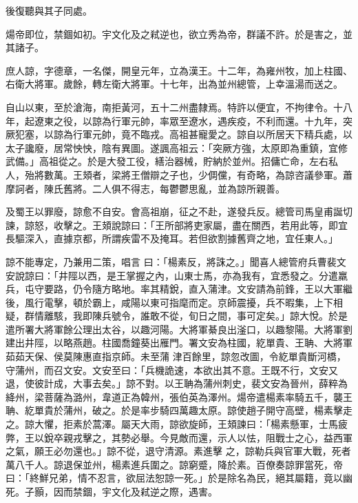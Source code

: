 \begin{pinyinscope}
 後復聽與其子同處。



 煬帝即位，禁錮如初。宇文化及之弒逆也，欲立秀為帝，群議不許。於是害之，並其諸子。



 庶人諒，字德章，一名傑，開皇元年，立為漢王。十二年，為雍州牧，加上柱國、右衛大將軍。歲餘，轉左衛大將軍。十七年，出為並州總管，上幸溫湯而送之。



 自山以東，至於滄海，南拒黃河，五十二州盡隸焉。特許以便宜，不拘律令。十八年，起遼東之役，以諒為行軍元帥，率眾至遼水，遇疾疫，不利而還。十九年，突厥犯塞，以諒為行軍元帥，竟不臨戎。高祖甚寵愛之。諒自以所居天下精兵處，以
 太子讒廢，居常怏怏，陰有異圖。遂諷高祖云：「突厥方強，太原即為重鎮，宜修武備。」高祖從之。於是大發工役，繕治器械，貯納於並州。招傭亡命，左右私人，殆將數萬。王頍者，梁將王僧辯之子也，少倜儻，有奇略，為諒咨議參軍。蕭摩訶者，陳氏舊將。二人俱不得志，每鬱鬱思亂，並為諒所親善。



 及蜀王以罪廢，諒愈不自安。會高祖崩，征之不赴，遂發兵反。總管司馬皇甫誕切諫，諒怒，收擊之。王頍說諒曰：「王所部將吏家屬，盡在關西，若用此等，即宜長驅深入，直據京都，所謂疾雷不及掩耳。若但欲割據舊齊之地，宜任東人。」



 諒不能專定，乃兼用二策，唱言
 曰：「楊素反，將誅之。」聞喜人總管府兵曹裴文安說諒曰：「井陘以西，是王掌握之內，山東士馬，亦為我有，宜悉發之。分遣羸兵，屯守要路，仍令隨方略地。率其精銳，直入蒲津。文安請為前鋒，王以大軍繼後，風行電擊，頓於霸上，咸陽以東可指麾而定。京師震擾，兵不暇集，上下相疑，群情離駭，我即陳兵號令，誰敢不從，旬日之間，事可定矣。」諒大悅。於是遣所署大將軍餘公理出太谷，以趣河陽。大將軍綦良出滏口，以趣黎陽。大將軍劉建出井陘，以略燕趙。柱國喬鐘葵出雁門。署文安為柱國，紇單貴、王聃、大將軍茹茹天保、侯莫陳惠直指京師。未至蒲
 津百餘里，諒忽改圖，令紇單貴斷河橋，守蒲州，而召文安。文安至曰：「兵機詭速，本欲出其不意。王既不行，文安又退，使彼計成，大事去矣。」諒不對。以王聃為蒲州刺史，裴文安為晉州，薛粹為絳州，梁菩薩為潞州，韋道正為韓州，張伯英為澤州。煬帝遣楊素率騎五千，襲王聃、紇單貴於蒲州，破之。於是率步騎四萬趣太原。諒使趙子開守高壁，楊素擊走之。諒大懼，拒素於蒿澤。屬天大雨，諒欲旋師，王頍諫曰：「楊素懸軍，士馬疲弊，王以銳卒親戎擊之，其勢必舉。今見敵而還，示人以怯，阻戰士之心，益西軍之氣，願王必勿還也。」諒不從，退守清源。素進擊
 之，諒勒兵與官軍大戰，死者萬八千人。諒退保並州，楊素進兵圍之。諒窮蹙，降於素。百僚奏諒罪當死，帝曰：「終鮮兄弟，情不忍言，欲屈法恕諒一死。」於是除名為民，絕其屬籍，竟以幽死。子顥，因而禁錮，宇文化及弒逆之際，遇害。




\end{pinyinscope}
